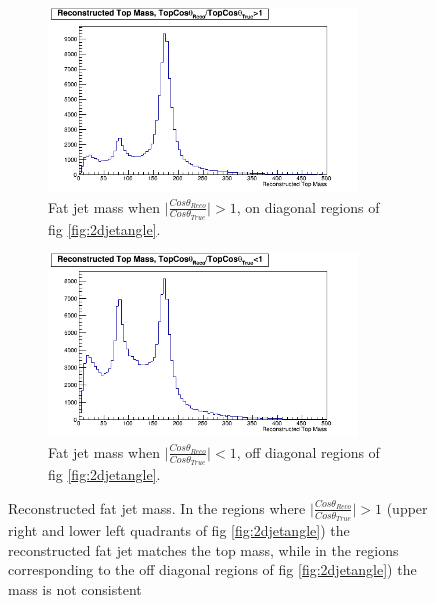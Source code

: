 \begin{figure}
  \centering
  \begin{subfigure}{.5\textwidth}
    \centering
    \includegraphics[width=0.9\textwidth]{TopAnalysis/figures/TopMassDiagonal.png}
    \caption[$\mid\frac{Cos\theta_{Reco}}{Cos\theta_{True}}\mid >1$]{Fat jet mass when $\mid\frac{Cos\theta_{Reco}}{Cos\theta_{True}}\mid >1$, on diagonal regions of fig \ref{fig:2djetangle}.}
  \end{subfigure}%
  \begin{subfigure}{.5\textwidth}
    \centering
    \includegraphics[width=0.9\textwidth]{TopAnalysis/figures/TopMassOffDiagonal.png}
    \caption[$\mid\frac{Cos\theta_{Reco}}{Cos\theta_{True}}\mid >1$]{Fat jet mass when $\mid\frac{Cos\theta_{Reco}}{Cos\theta_{True}}\mid <1$, off diagonal regions of fig \ref{fig:2djetangle}.}
  \end{subfigure}
  \caption[Reconstructed fat jet mass]{Reconstructed fat jet mass. In the regions where $\mid\frac{Cos\theta_{Reco}}{Cos\theta_{True}}\mid >1$ (upper right and lower left quadrants of fig \ref{fig:2djetangle}) the reconstructed fat jet matches the top mass, while in the regions corresponding to the off diagonal regions of fig \ref{fig:2djetangle}) the mass is not consistent}
  \label{fig:diagonalTopMass}
\end{figure}


